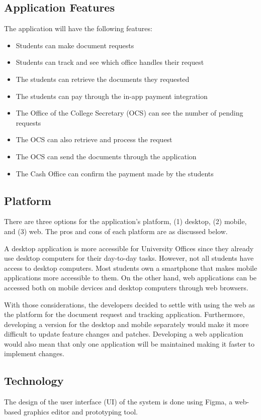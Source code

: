 \subsection{Application Features}
The application will have the following features:
\begin{itemize}
   \item Students can make document requests
   \item Students can track and see which office handles their request
   \item The students can retrieve the documents they requested
   \item The students can pay through the in-app payment integration
   \item The Office of the College Secretary (OCS) can see the number of pending requests
   \item The OCS can also retrieve and process the request
   \item The OCS can send the documents through the application
   \item The Cash Office can confirm the payment made by the students
\end{itemize}

\subsection{Platform}
There are three options for the application’s platform, (1) desktop, (2) mobile, and (3) web. The pros and cons of each platform are as discussed below.

A desktop application is more accessible for University Offices since they already use desktop computers for their day-to-day tasks. However, not all students have access to desktop computers. Most students own a smartphone that makes mobile applications more accessible to them. On the other hand, web applications can be accessed both on mobile devices and desktop computers through web browsers.

With those considerations, the developers decided to settle with using the web as the platform for the document request and tracking application. Furthermore, developing a version for the desktop and mobile separately would make it more difficult to update feature changes and patches. Developing a web application would also mean that only one application will be maintained making it faster to implement changes.
\subsection{Technology}
The design of the user interface (UI) of the system is done using Figma, a web-based graphics editor and prototyping tool.


